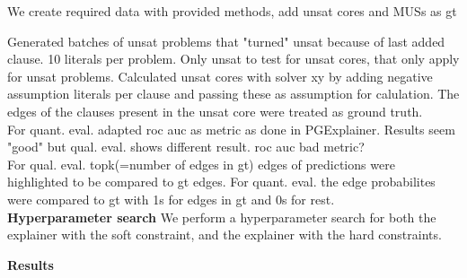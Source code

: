 We create required data with provided methods, add unsat cores and MUSs as gt


Generated batches of unsat problems that "turned" unsat because of last added clause. 10 literals per problem. Only unsat to test for unsat cores, that only apply for unsat problems. Calculated unsat cores with solver xy by adding negative assumption literals per clause and passing these as assumption for calulation. The edges of the clauses present in the unsat core were treated as ground truth. \\


For quant. eval. adapted roc auc as metric as done in PGExplainer. Results seem "good" but qual. eval. shows different result. roc auc bad metric? \\
For qual. eval. topk(=number of edges in gt) edges of predictions were highlighted to be compared to gt edges. For quant. eval. the edge probabilites were compared to gt with 1s for edges in gt and 0s for rest. \\

\textbf{Hyperparameter search}
We perform a hyperparameter search for both the explainer with the soft constraint, and the explainer with the hard constraints.

\textbf{Results}
